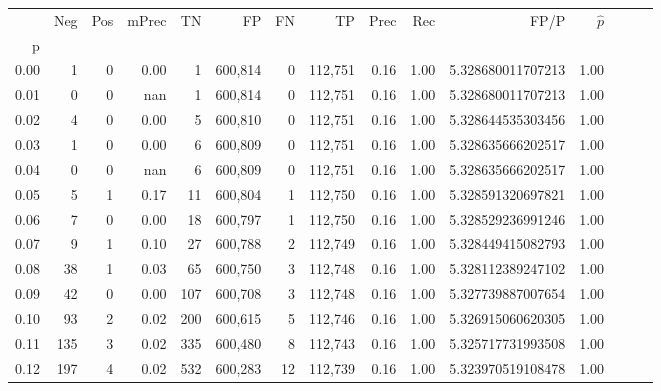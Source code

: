 \begin{tabular}{rrrrrrrrrrrrrrr}
\toprule
{} &     Neg &    Pos & mPrec &       TN &       FP &       FN &       TP &  Prec &   Rec &                    FP/P & $\hat{p}$ \\
p    &         &        &       &          &          &          &          &       &       &                         &           \\
\midrule
0.00 &       1 &      0 &  0.00 &        1 &  600,814 &        0 &  112,751 &  0.16 &  1.00 &       5.328680011707213 &      1.00 \\
0.01 &       0 &      0 &   nan &        1 &  600,814 &        0 &  112,751 &  0.16 &  1.00 &       5.328680011707213 &      1.00 \\
0.02 &       4 &      0 &  0.00 &        5 &  600,810 &        0 &  112,751 &  0.16 &  1.00 &       5.328644535303456 &      1.00 \\
0.03 &       1 &      0 &  0.00 &        6 &  600,809 &        0 &  112,751 &  0.16 &  1.00 &       5.328635666202517 &      1.00 \\
0.04 &       0 &      0 &   nan &        6 &  600,809 &        0 &  112,751 &  0.16 &  1.00 &       5.328635666202517 &      1.00 \\
0.05 &       5 &      1 &  0.17 &       11 &  600,804 &        1 &  112,750 &  0.16 &  1.00 &       5.328591320697821 &      1.00 \\
0.06 &       7 &      0 &  0.00 &       18 &  600,797 &        1 &  112,750 &  0.16 &  1.00 &       5.328529236991246 &      1.00 \\
0.07 &       9 &      1 &  0.10 &       27 &  600,788 &        2 &  112,749 &  0.16 &  1.00 &       5.328449415082793 &      1.00 \\
0.08 &      38 &      1 &  0.03 &       65 &  600,750 &        3 &  112,748 &  0.16 &  1.00 &       5.328112389247102 &      1.00 \\
0.09 &      42 &      0 &  0.00 &      107 &  600,708 &        3 &  112,748 &  0.16 &  1.00 &       5.327739887007654 &      1.00 \\
0.10 &      93 &      2 &  0.02 &      200 &  600,615 &        5 &  112,746 &  0.16 &  1.00 &       5.326915060620305 &      1.00 \\
0.11 &     135 &      3 &  0.02 &      335 &  600,480 &        8 &  112,743 &  0.16 &  1.00 &       5.325717731993508 &      1.00 \\
0.12 &     197 &      4 &  0.02 &      532 &  600,283 &       12 &  112,739 &  0.16 &  1.00 &       5.323970519108478 &      1.00 \\

\end{tabular}
